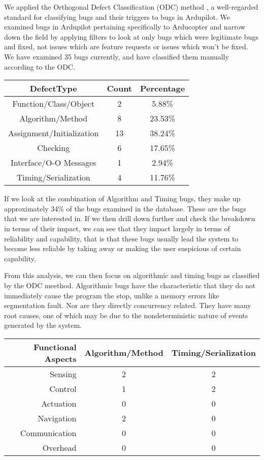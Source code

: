 We applied the Orthogonal Defect Classification (ODC) method 
\cite{chillarege_orthogonal_1992}, a well-regarded standard for
classifying bugs and their triggers to bugs in Ardupilot. We examined
bugs in Ardupilot pertaining specifically to Arducopter and narrow
down the field by applying filters to look at only bugs which were
legitimate bugs and fixed, not issues which are feature requests or
issues which won't be fixed. We have examined 35 bugs currently, and
have classified them manually according to the ODC. 

\begin{table} [h]
  \begin{tabular}{c|c c}
    DefectType & Count & Percentage \\
    \hline
    Function/Class/Object & 2 & 5.88\%\\
    Algorithm/Method & 8 & 23.53\% \\
    Assignment/Initialization & 13 & 38.24\%\\
    Checking & 6 & 17.65\%\\
    Interface/O-O Messages & 1 & 2.94\% \\
    Timing/Serialization & 4 & 11.76\%\\
    \hline
  \end{tabular}
\end{table}

If we look at the combination of Algorithm and Timing bugs, they make
up approximately 34\% of the bugs examined in the database. These are
the bugs that we are interested in. If we then drill down further and
check the breakdown in terms of their impact, we can see that they
impact largely in terms of reliability and capability, that is that
these bugs usually lead the system to become less reliable by taking
away or making the user suspicious of certain capability. 

From this analysis, we can then focus on algorithmic and timing bugs
as classified by the ODC meethod. Algorithmic bugs have the
characteristic that they do not immediately cause the program the
stop, unlike a memory errors like segmentation fault. Nor are they
directly concurrency related. They have many root causes, one of which
may be due to the nondeterministic nature of events generated by the
system.

\begin{table} [h]
  \begin{tabular}{r|c c}
    Functional Aspects & Algorithm/Method & Timing/Serialization \\
    \hline 
    Sensing & 2 & 2 \\
    Control & 1 & 2 \\
    Actuation & 0 & 0 \\
    Navigation & 2 & 0 \\
    Communication & 0 & 0 \\
    Overhead & 0 & 0 \\
    \hline
  \end{tabular}
\end{table}

